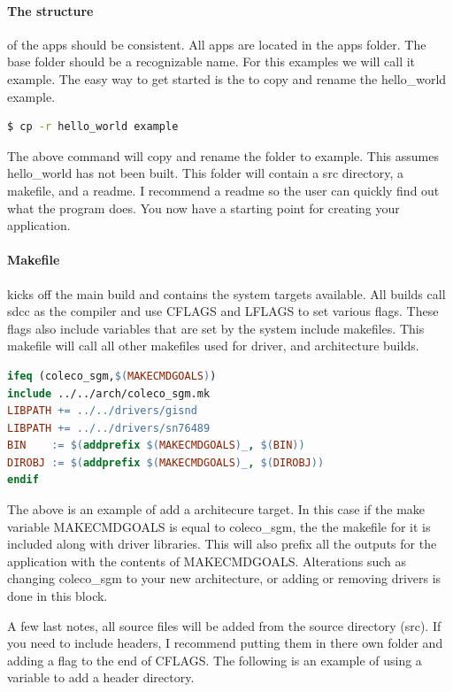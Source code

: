 \documentclass{article}
\begin{document}
  \paragraph{The structure}of the apps should be consistent. All apps are located in the apps folder.
  The base folder should be a recognizable name. For this examples we will call it example.
  The easy way to get started is the to copy and rename the hello\_world example.
  \begin{lstlisting}[language=bash]
    $ cp -r hello_world example
  \end{lstlisting}
  The above command will copy and rename the folder to example. This assumes hello\_world has not been built.
  This folder will contain a src directory, a makefile, and a readme. I recommend a readme so the user can quickly find out what
  the program does. You now have a starting point for creating your application.

  \paragraph{Makefile}kicks off the main build and contains the system targets available. All builds call sdcc as the compiler and use
  CFLAGS and LFLAGS to set various flags. These flags also include variables that are set by the system include makefiles. This makefile
  will call all other makefiles used for driver, and architecture builds.

    \begin{lstlisting}[language=make]
ifeq (coleco_sgm,$(MAKECMDGOALS))
include ../../arch/coleco_sgm.mk
LIBPATH += ../../drivers/gisnd
LIBPATH += ../../drivers/sn76489
BIN    := $(addprefix $(MAKECMDGOALS)_, $(BIN))
DIROBJ := $(addprefix $(MAKECMDGOALS)_, $(DIROBJ))
endif
  \end{lstlisting}

  The above is an example of add a architecure target. In this case if the make variable MAKECMDGOALS is equal to coleco\_sgm, the the makefile for it is included along with driver libraries.
  This will also prefix all the outputs for the application with the contents of MAKECMDGOALS. Alterations such as changing coleco\_sgm to your new architecture, or adding or removing drivers
  is done in this block.

  A few last notes, all source files will be added from the source directory (src). If you need to include headers, I recommend putting them in there own folder and adding a flag to the end of CFLAGS.
  The following is an example of using a variable to add a header directory.
\end{document}
